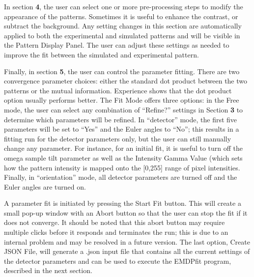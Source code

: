 \documentclass[DIV=calc, paper=letter, fontsize=11pt]{scrartcl}	 %
\begin{document}
In section \textbf{4}, the user can select one or more pre-processing steps to modify the appearance of the patterns. Sometimes it is useful to enhance the contrast, or subtract the background.  Any setting changes in this section are automatically applied to both the experimental and simulated patterns and will be visible in the Pattern Display Panel.  The user can adjust these settings as needed to improve the fit between the simulated and experimental pattern.

Finally, in section \textbf{5}, the user can control the parameter fitting.  There are two convergence parameter choices: either the standard dot product between the two patterns or the mutual information.  Experience shows that the dot product option usually performs better.  The Fit Mode offers three options: in the Free mode, the user can select any combination of ``Refine?'' settings in Section \textbf{3} to determine which parameters will be refined. In ``detector'' mode, the first five parameters will be set to ``Yes'' and the Euler angles to ``No''; this results in a fitting run for the detector parameters only, but the user can still manually change any parameter.  For instance, for an initial fit, it is useful to turn off the omega sample tilt parameter as well as the Intensity Gamma Value (which sets how the pattern intensity is mapped onto the [0,255] range of pixel intensities.  Finally, in ``orientation'' mode, all detector parameters are turned off and the Euler angles are turned on.  

A parameter fit is initiated by pressing the Start Fit button.  This will create a small pop-up window with an Abort button so that the user can stop the fit if it does not converge.  It should be noted that this abort button may require multiple clicks before it responds and terminates the run; this is due to an internal problem and may be resolved in a future version.  The last option, Create JSON File, will generate a .json input file that contains all the current settings of the detector parameters and can be used to execute the \textsf{EMDPfit} program, described in the next section.
\end{document}
